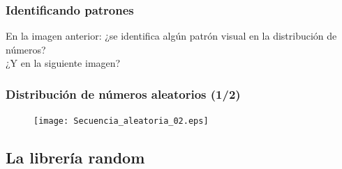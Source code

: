 \documentclass[12pt]{beamer}
\begin{document}
\begin{frame}
\frametitle{Identificando patrones}
En la imagen anterior: ¿se identifica algún patrón visual en la distribución de números?
\\
\bigskip
\pause
¿Y en la siguiente imagen?
\end{frame}
\begin{frame}[fragile]
\frametitle{Distribución de números aleatorios (1/2)}
\begin{figure}
  \centering
  \texttt{[image: Secuencia\_aleatoria\_02.eps]}
\end{figure}
\end{frame}

\subsection{La librería random}
\end{document}
